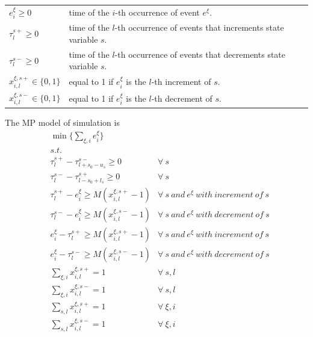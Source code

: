 \documentclass[]{interact}
\theoremstyle{plain}%
\theoremstyle{definition}
\theoremstyle{remark}
\begin{document}
\begin{table}[h]
	\begin{tabular}{ll}
		\hline
		$e^{\xi}_{i}\ge 0$ & time of the $i$-th occurrence of event $e^{\xi}$.\\
		$\tau^{s+}_{l}\ge 0$ & time of the  $l$-th occurrence of events that increments state variable $s$.\\
		$\tau^{s-}_{l}\ge 0$ &   time of the  $l$-th occurrence of events that decrements state variable $s.$\\
		$x^{\xi,s+}_{i,l}\in\{0,1\}$& equal to 1 if $e^{\xi}_{i}$ is the $l$-th increment of $s$.\\
		$x^{\xi,s-}_{i,l}\in\{0,1\}$& equal to 1 if $e^{\xi}_{i}$ is the $l$-th decrement of $s$.\\\hline
	\end{tabular}
\end{table} 


The MP model of simulation is
\begin{eqnarray}
&\min\{\sum_{\xi,i} e^{\xi}_{i}\}&\\
&s.t.&\\
&\tau^{s+}_{l} - \tau^{s-}_{l+s_0-u_s} \ge 0& \forall\ s \\
&\tau^{s-}_{l} - \tau^{s+}_{l-s_0+l_s} \ge 0& \forall\ s \\
&\tau^{s+}_{l} - e^{\xi}_{i} \ge M(x^{\xi,s+}_{i,l}-1)& \forall\ s\ and\ e^{\xi}\ with\ increment\ of\ s\\
&\tau^{s-}_{l} - e^{\xi}_{i} \ge M(x^{\xi,s-}_{i,l}-1)& \forall\ s\ and\ e^{\xi}\ with\ decrement\ of\ s\\
&e^{\xi}_{i} - \tau^{s+}_{l} \ge M(x^{\xi,s+}_{i,l}-1) & \forall\ s\ and\ e^{\xi}\ with\ increment\ of\ s\\
&e^{\xi}_{i} - \tau^{s-}_{l} \ge M(x^{\xi,s-}_{i,l}-1) & \forall\ s\ and\ e^{\xi}\ with\ decrement\ of\ s\\
&\sum_{\xi,i} x^{\xi,s+}_{i,l} =1& \forall\ s,l\\
&\sum_{\xi,i} x^{\xi,s-}_{i,l} =1& \forall\ s,l\\
&\sum_{s,l} x^{\xi,s+}_{i,l} =1& \forall\ \xi,i\\
&\sum_{s,l} x^{\xi,s-}_{i,l} =1& \forall\ \xi,i\\
\end{eqnarray}
\end{document}
